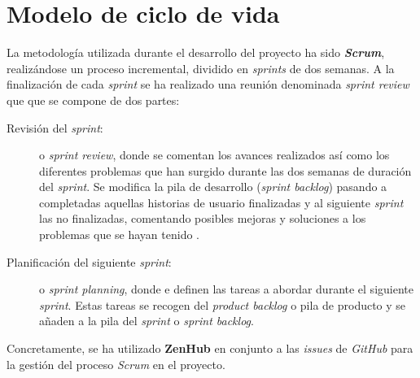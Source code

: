 \newpage

\section{Modelo de ciclo de vida}
La metodología utilizada durante el desarrollo del proyecto ha sido \textit{\textbf{Scrum}}, realizándose un proceso incremental, dividido en \textit{sprints} de dos semanas. A la finalización de cada \textit{sprint} se ha realizado una reunión denominada \textit{sprint review} que que se compone de dos partes:
\begin{description}
	\item [Revisión del \textit{sprint}:] o \textit{sprint review}, donde se comentan los avances realizados así como los diferentes problemas que han surgido durante las dos semanas de duración del \textit{sprint}.
Se modifica la pila de desarrollo (\textit{sprint backlog}) pasando a completadas aquellas historias de usuario finalizadas y al siguiente \textit{sprint} las no finalizadas, comentando posibles mejoras y soluciones a los problemas que se hayan tenido \cite{scrum_master_scrum_2019}.

	\item [Planificación del siguiente \textit{sprint}:] o \textit{sprint planning}, donde e definen las tareas a abordar  durante el siguiente \textit{sprint}. Estas tareas se recogen del \textit{product backlog} o pila de producto y se añaden a la pila del \textit{sprint} o \textit{sprint backlog}.
\end{description}

	Concretamente, se ha utilizado \textbf{ZenHub} en conjunto a las \textit{issues} de \textit{GitHub} para la gestión del proceso \textit{Scrum} en el proyecto.

